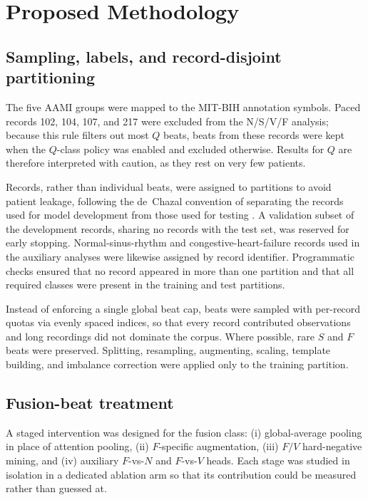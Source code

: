 \section{Proposed Methodology}
\label{sec:proposed_methodology}

\subsection{Sampling, labels, and record-disjoint partitioning}

The five AAMI groups were mapped to the MIT-BIH annotation symbols. Paced
records 102, 104, 107, and 217 were excluded from the N/S/V/F analysis;
because this rule filters out most $Q$ beats, beats from these records were
kept when the $Q$-class policy was enabled and excluded otherwise. Results
for $Q$ are therefore interpreted with caution, as they rest on very few
patients.

Records, rather than individual beats, were assigned to partitions to avoid
patient leakage, following the de~Chazal convention of separating the
records used for model development from those used for
testing \cite{dechazal2004}. A validation subset of the development records,
sharing no records with the test set, was reserved for early stopping.
Normal-sinus-rhythm and congestive-heart-failure records used in the
auxiliary analyses were likewise assigned by record identifier. Programmatic
checks ensured that no record appeared in more than one partition and that
all required classes were present in the training and test partitions.

Instead of enforcing a single global beat cap, beats were sampled with
per-record quotas via evenly spaced indices, so that every record
contributed observations and long recordings did not dominate the corpus.
Where possible, rare $S$ and $F$ beats were preserved. Splitting,
resampling, augmenting, scaling, template building, and imbalance correction
were applied only to the training partition.

\subsection{Fusion-beat treatment}

A staged intervention was designed for the fusion class: (i) global-average
pooling in place of attention pooling, (ii) $F$-specific augmentation,
(iii) $F/V$ hard-negative mining, and (iv) auxiliary $F$-vs-$N$ and
$F$-vs-$V$ heads. Each stage was studied in isolation in a dedicated
ablation arm so that its contribution could be measured rather than guessed
at.

